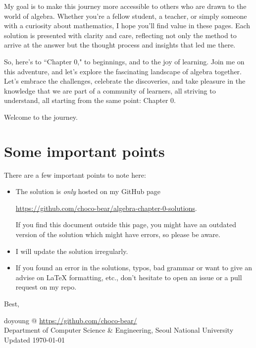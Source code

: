 My goal is to make this journey more accessible to others who are drawn to the world of algebra. Whether you're a fellow student, a teacher, or simply someone with a curiosity about mathematics, I hope you'll find value in these pages. Each solution is presented with clarity and care, reflecting not only the method to arrive at the answer but the thought process and insights that led me there.

So, here's to ``Chapter 0," to beginnings, and to the joy of learning. Join me on this adventure, and let's explore the fascinating landscape of algebra together. Let's embrace the challenges, celebrate the discoveries, and take pleasure in the knowledge that we are part of a community of learners, all striving to understand, all starting from the same point: Chapter 0.

Welcome to the journey.

\newpage
\section*{Some important points}
There are a few important points to note here:
\begin{itemize}
    \item The solution is \emph{only} hosted on my GitHub page
        \begin{center}
		  \href{https://github.com/choco-bear/algebra-chapter-0-solutions}{https://github.com/choco-bear/algebra-chapter-0-solutions}.
        \end{center} 
        If you find this document outside this page, you might have an outdated version of the solution which might have errors, so please be aware.
    \item I will update the solution irregularly.
    \item If you found an error in the solutions, typos, bad grammar or want to give an advise on LaTeX formatting, etc., don't hesitate to open an issue or a pull request on my repo. 
\end{itemize}

Best,

\begin{flushright}
doyoung @ \href{https://github.com/choco-bear/}{https://github.com/choco-bear/} \\
Department of Computer Science \& Engineering, Seoul National University \\
Updated \specialdate\today
\end{flushright}
